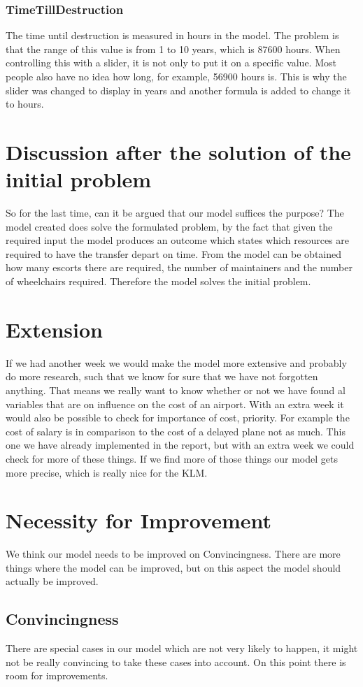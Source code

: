 \documentclass[a4paper, 11pt, notitlepage]{report}
\begin{document}
		\subsection{TimeTillDestruction}
		The time until destruction is measured in hours in the model. The problem is that the range of this value is from 1 to 10 years, which is 87600 hours. When controlling this with a slider, it is not only to put it on a specific value. Most people also have no idea how long, for example, 56900 hours is. This is why the slider was changed to display in years and another formula is added to change it to hours.
		
\chapter{Discussion after the solution of the initial problem}
So for the last time, can it be argued that our model suffices the purpose? The model created does solve the formulated problem, by the fact that given the required input the model produces an outcome which states which resources are required to have the transfer depart on time. From the model can be obtained how many escorts there are required, the number of maintainers and the number of wheelchairs required. Therefore the model solves the initial problem.
\chapter{Extension}
If we had another week we would make the model more extensive and probably do more research, such that we know for sure that we have not forgotten anything. That means we really want to know whether or not we have found al variables that are on influence on the cost of an airport. With an extra week it would also be possible to check for importance of cost, priority. For example the cost of  salary is in comparison to the cost of a delayed plane not as much. This one we have already implemented in the report, but with an extra week we could check for more of these things. If we find more of those things our model gets more precise, which is really nice for the KLM.

\chapter{Necessity for Improvement}
We think our model needs to be improved on Convincingness. There are more things where the model can be improved, but on this aspect the model should actually be improved.
\section{Convincingness}
There are special cases in our model which are not very likely to happen, it might not be really convincing to take these cases into account. On this point there is room for improvements.
\end{document}
